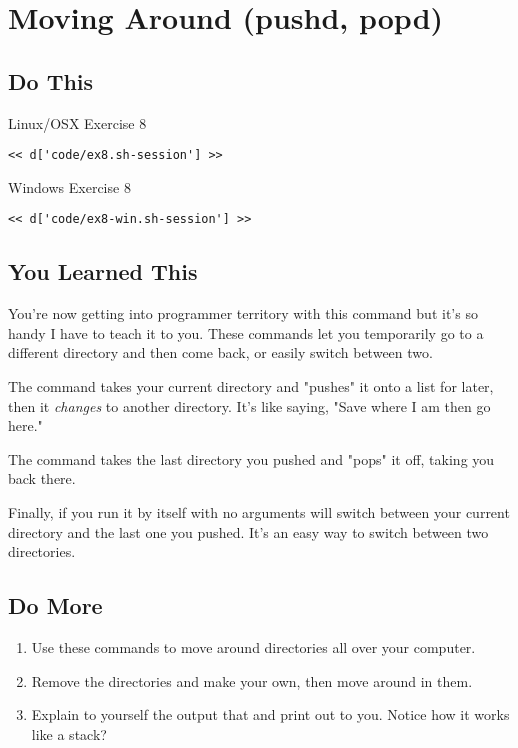 \chapter{Moving Around (pushd, popd)}

\section{Do This}

\begin{code}{Linux/OSX Exercise 8}
\begin{Verbatim}
<< d['code/ex8.sh-session'] >>
\end{Verbatim}
\end{code}

\begin{code}{Windows Exercise 8}
\begin{Verbatim}
<< d['code/ex8-win.sh-session'] >>
\end{Verbatim}
\end{code}

\section{You Learned This}

You're now getting into programmer territory with this command but it's so
handy I have to teach it to you.  These commands let you temporarily go
to a different directory and then come back, or easily switch between
two.

The  command takes your current directory and "pushes" it
onto a list for later, then it \emph{changes} to another directory.  It's
like saying, "Save where I am then go here."

The  command takes the last directory you pushed and "pops"
it off, taking you back there.

Finally,  if you run it by itself with no arguments will
switch between your current directory and the last one you pushed.  It's
an easy way to switch between two directories.

\section{Do More}

\begin{enumerate}
\item Use these commands to move around directories all over your
    computer.
\item Remove the  directories and make your own, then
    move around in them.
\item Explain to yourself the output that  and 
    print out to you.  Notice how it works like a stack?
\end{enumerate}

